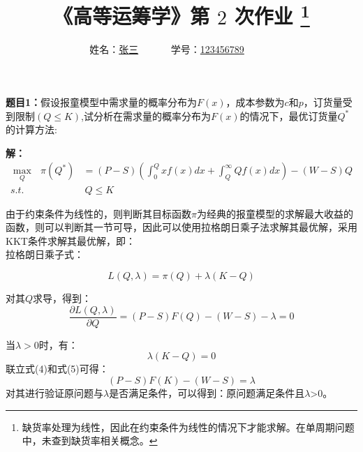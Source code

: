 \documentclass[12pt,a4paper]{article}
\begin{document}
\title{
{\heiti《高等运筹学》第 {$2$} 次作业
\footnote{
 缺货率处理为线性，因此在约束条件为线性的情况下才能求解。在单周期问题中，未查到缺货率相关概念。
}
}
}
\date{}

\author{
姓名：\underline{张三}~~~~~~
学号：\underline{123456789}~~~~~~}

\maketitle

\noindent
\section*{\heiti \color{red}{报童模型拓展}}
\noindent
{\bf 题目1：}假设报童模型中需求量的概率分布为$F(x)$，成本参数为$c$和$p$，订货量受到限制$(Q\leq K)$,试分析在需求量的概率分布为$F(x)$的情况下，最优订货量$Q^*$的计算方法:



\vspace{5pt}
\noindent
{\bf 解：}
\begin{align}
    \max_Q\text{\ }\pi \left( Q^{*} \right) &=\left( P-S \right) \left( \int_0^Q{xf\left( x \right) dx+\int_Q^{\infty}{Qf\left( x \right) dx}} \right) -\left( W-S \right) Q \\
    s.t.&\ Q\le K
\end{align}


由于约束条件为线性的，则判断其目标函数$\pi $为经典的报童模型的求解最大收益的函数，则可以判断其一节可导，因此可以使用拉格朗日乘子法求解其最优解，采用KKT条件求解其最优解，即：\\
拉格朗日乘子式：

\begin{equation}
    L\left( Q,\lambda  \right) =\pi \left( Q \right) +\lambda \left( K-Q \right)
\end{equation}

对其$Q$求导，得到：
\begin{equation}
    \frac{\partial L\left( Q,\lambda  \right)}{\partial Q} =\left( P-S \right) F\left( Q\right) -\left( W-S \right) -\lambda =0
\end{equation}

当$\lambda >0$时，有：
\begin{equation}
    \lambda \left( K-Q \right) =0   
\end{equation}
联立式(4)和式(5)可得：
\begin{equation}
    \left( P-S \right) F\left( K\right) -\left( W-S \right) =\lambda              
\end{equation}
对其进行验证原问题与$\lambda$是否满足条件，可以得到：原问题满足条件且$\lambda$>0。
\end{document}
